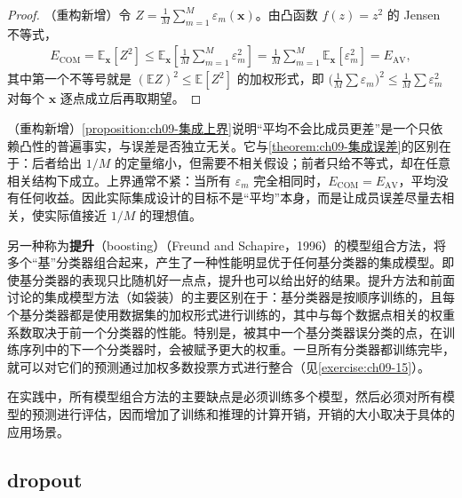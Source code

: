 \documentclass[../../main.tex]{subfiles}
\begin{document}
\begin{proof}
（重构新增）令 $Z=\frac{1}{M}\sum_{m=1}^{M}\varepsilon_{m}(\boldsymbol{x})$。由凸函数 $f(z)=z^{2}$ 的 Jensen 不等式，
\begin{align*}
E_{\mathrm{COM}}=\mathbb{E}_{\boldsymbol{x}}[Z^{2}]\leqslant\mathbb{E}_{\boldsymbol{x}}\!\left[\frac{1}{M}\sum_{m=1}^{M}\varepsilon_{m}^{2}\right]=\frac{1}{M}\sum_{m=1}^{M}\mathbb{E}_{\boldsymbol{x}}[\varepsilon_{m}^{2}]=E_{\mathrm{AV}},
\end{align*}
其中第一个不等号就是 $(\mathbb{E}Z)^{2}\leqslant\mathbb{E}[Z^{2}]$ 的加权形式，即 $\bigl(\frac{1}{M}\sum\varepsilon_{m}\bigr)^{2}\leqslant\frac{1}{M}\sum\varepsilon_{m}^{2}$ 对每个 $\boldsymbol{x}$ 逐点成立后再取期望。
\end{proof}

\begin{remark}（重构新增）\cref{proposition:ch09-集成上界}说明“平均不会比成员更差”是一个只依赖凸性的普遍事实，与误差是否独立无关。它与\cref{theorem:ch09-集成误差}的区别在于：后者给出 $1/M$ 的定量缩小，但需要不相关假设；前者只给不等式，却在任意相关结构下成立。上界通常不紧：当所有 $\varepsilon_{m}$ 完全相同时，$E_{\mathrm{COM}}=E_{\mathrm{AV}}$，平均没有任何收益。因此实际集成设计的目标不是“平均”本身，而是让成员误差尽量去相关，使实际值接近 $1/M$ 的理想值。
\end{remark}

另一种称为\textbf{提升}（boosting）（Freund and Schapire，1996）的模型组合方法，将多个“基”分类器组合起来，产生了一种性能明显优于任何基分类器的集成模型。即使基分类器的表现只比随机好一点点，提升也可以给出好的结果。提升方法和前面讨论的集成模型方法（如袋装）的主要区别在于：基分类器是按顺序训练的，且每个基分类器都是使用数据集的加权形式进行训练的，其中与每个数据点相关的权重系数取决于前一个分类器的性能。特别是，被其中一个基分类器误分类的点，在训练序列中的下一个分类器时，会被赋予更大的权重。一旦所有分类器都训练完毕，就可以对它们的预测通过加权多数投票方式进行整合（见\cref{exercise:ch09-15}）。

在实践中，所有模型组合方法的主要缺点是必须训练多个模型，然后必须对所有模型的预测进行评估，因而增加了训练和推理的计算开销，开销的大小取决于具体的应用场景。

\subsection{dropout}\label{subsection:ch09-dropout}
\end{document}
